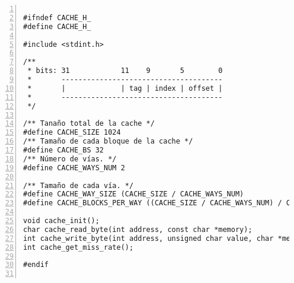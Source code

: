 \documentclass[11pt,a4paper]{article}
\begin{document}
\begin{lstlisting}[numbers=left, tabsize=2, basicstyle=\fontsize{11}{13}\ttfamily, frame=single, caption={makefile}]

#ifndef CACHE_H_
#define CACHE_H_

#include <stdint.h>

/**
 * bits: 31            11    9       5        0
 *       --------------------------------------
 *       |             | tag | index | offset |
 *       --------------------------------------
 */

/** Tanaño total de la cache */
#define CACHE_SIZE 1024
/** Tamaño de cada bloque de la cache */
#define CACHE_BS 32
/** Número de vías. */
#define CACHE_WAYS_NUM 2

/** Tamaño de cada vía. */
#define CACHE_WAY_SIZE (CACHE_SIZE / CACHE_WAYS_NUM)
#define CACHE_BLOCKS_PER_WAY ((CACHE_SIZE / CACHE_WAYS_NUM) / CACHE_BS)

void cache_init();
char cache_read_byte(int address, const char *memory);
int cache_write_byte(int address, unsigned char value, char *memory);
int cache_get_miss_rate();

#endif


\end{lstlisting}
\end{document}
